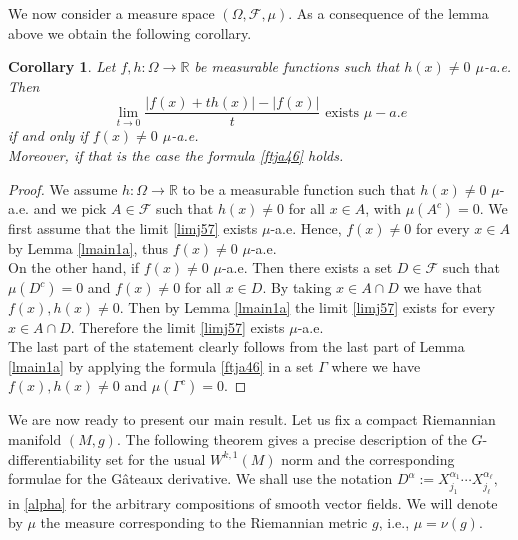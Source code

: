 \documentclass[a4paper,12pt,reqno]{amsart}%
\newcommand{\cal}{\mathcal}
\newtheorem{corollary}[theorem]{Corollary}
\theoremstyle{definition}
\numberwithin{equation}{section}
\numberwithin{theorem}{section}
\newcommand{\ar}{\mathbb{R}}
\newcommand{\beq}{\begin{equation}}
\newcommand{\eq}{\end{equation}}
\begin{document}
We now consider a measure space $(\Omega, \cal{F},\mu)$. As a consequence of the  lemma above we obtain  the following corollary.
\begin{corollary} \label{cordd2} Let $f, h:\Omega\rightarrow \ar$ be measurable functions such that $h(x)\neq 0$ $\mu$-a.e. Then 
\beq\lim\limits_{t\rightarrow 0}\frac{|f(x)+th(x)|-|f(x)|}{t} \mbox{ exists } \mu-a.e\label{limj57}\eq
if and only if $f(x)\neq 0$ $\mu$-a.e.\\

Moreover, if that is the case the formula \eqref{ftja46} holds.
\end{corollary}
\begin{proof} We assume $h:\Omega\rightarrow \ar$ to be a measurable function such that $h(x)\neq 0$ $\mu$-a.e. and we pick $A\in \mathcal{F}$  such that $h(x)\neq 0$ for all $x\in A$, with $\mu(A^c)=0$. We first  assume that  the limit \eqref{limj57} exists $\mu$-a.e. Hence, $f(x)\neq 0$ for every  $x\in A$ by Lemma \ref{lmain1a},  thus  $f(x)\neq 0$  $\mu$-a.e.  \\

On the other hand, if $f(x)\neq 0$  $\mu$-a.e. Then there exists a  set $D\in \cal{F}$ such that $\mu(D^c)=0$ and  $f(x)\neq 0$ for all $x\in D$. By taking $x\in A\cap D$ we have that $f(x), h(x)\neq 0$. Then by Lemma \ref{lmain1a} the limit \eqref{limj57} exists for every $x\in A\cap D$. Therefore the limit \eqref{limj57} 
 exists $\mu$-a.e.\\
 
 The last part of the statement clearly follows from the last part of Lemma \ref{lmain1a} by applying the formula \eqref{ftja46} in a set $\Gamma$ where we have $f(x), h(x)\neq 0$ and $\mu(\Gamma^c)=0.$
\end{proof}
We are now ready to present our main result. Let us fix a compact Riemannian manifold $(M,g).$ 
The following theorem 
gives a precise description of the $G$-differentiability set for the usual  $W^{k,1}(M)$ norm and the corresponding formulae for the  G\^ateaux derivative. We shall use the notation $
 D^{\alpha}:=X_{j_1}^{\alpha_1}\cdots X_{j_\ell}^{\alpha_\ell},$ in \eqref{alpha} for the arbitrary compositions of smooth vector fields. We will denote by $\mu$ the measure corresponding to the Riemannian metric $g$, i.e., $\mu=\nu(g)$.\\
\end{document}
